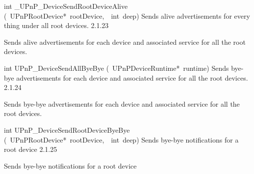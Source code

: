\documentclass{article}
\begin{document}
\begin{cxxentry}
\begin{cxxentry}
\begin{cxxfunction}
\begin{cxxdoc}
\end{cxxdoc}
\end{cxxfunction}
\begin{cxxfunction}
{int}
        {\_UPnP\_DeviceSendRootDeviceAlive}
        {(\ UPnPRootDevice*\ rootDevice,\ \ int\ deep)}
        {Sends alive advertisements for every thing under all root devices. }
        {2.1.23}
\begin{cxxdoc}
Sends alive advertisements for each device and associated service for all the
root devices.


\end{cxxdoc}
\end{cxxfunction}
\begin{cxxfunction}
{int}
        {UPnP\_DeviceSendAllByeBye}
        {(\ UPnPDeviceRuntime*\ runtime)}
        {Sends bye-bye advertisements for each device and associated service for all the root devices.}
        {2.1.24}
\begin{cxxdoc}
Sends bye-bye advertisements for each device and associated service for all the
root devices.


\end{cxxdoc}
\end{cxxfunction}
\begin{cxxfunction}
{int}
        {UPnP\_DeviceSendRootDeviceByeBye}
        {(\ UPnPRootDevice*\ rootDevice,\ \ int\ deep)}
        {Sends bye-bye notifications for a root device}
        {2.1.25}
\begin{cxxdoc}
Sends bye-bye notifications for a root device



\end{cxxdoc}
\end{cxxfunction}
\end{cxxentry}
\end{cxxentry}
\end{document}
